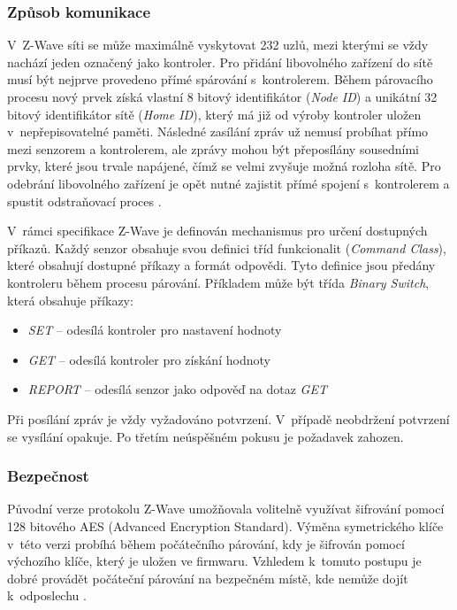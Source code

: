  \subsubsection{Způsob komunikace}
 V~Z-Wave síti se může maximálně vyskytovat 232 uzlů, mezi kterými se vždy nachází jeden označený
 jako kontroler. Pro přidání libovolného zařízení do sítě musí být nejprve provedeno přímé spárování
 s~kontrolerem. Během párovacího procesu nový prvek získá vlastní 8 bitový identifikátor (\textit{Node ID}) a 
 unikátní 32 bitový identifikátor sítě (\textit{Home ID}), který má již od výroby kontroler uložen v~nepřepisovatelné paměti.
 Následné zasílání zpráv už nemusí probíhat přímo mezi senzorem a kontrolerem, ale zprávy mohou
 být přeposílány sousedními prvky, které jsou trvale napájené, čímž se velmi zvyšuje možná rozloha sítě. 
 Pro odebrání libovolného zařízení je opět nutné zajistit přímé spojení s~kontrolerem a spustit odstraňovací
 proces \cite{cesnet-survey}.
 
 V~rámci specifikace Z-Wave \cite{zwave-spec} je definován mechanismus pro určení dostupných příkazů. Každý senzor obsahuje
 svou definici tříd funkcionalit (\textit{Command Class}), které obsahují dostupné příkazy a formát odpovědi. Tyto definice
 jsou předány kontroleru během procesu párování. Příkladem může být třída \textit{Binary Switch}, která obsahuje příkazy:
 \begin{itemize}
 \item \textit{SET} -- odesílá kontroler pro nastavení hodnoty 
 \item \textit{GET} -- odesílá kontroler pro získání hodnoty  
 \item \textit{REPORT} -- odesílá senzor jako odpověď na dotaz \textit{GET} 
 \end{itemize} 
 
 Při posílání zpráv je vždy vyžadováno potvrzení. V~případě neobdržení potvrzení se vysílání opakuje. 
 Po třetím neúspěšném pokusu je požadavek zahozen.
 
 \subsubsection{Bezpečnost}
 Původní verze protokolu Z-Wave umožňovala volitelně využívat šifrování pomocí 128 bitového AES (Advanced Encryption Standard).
 Výměna symetrického klíče v~této verzi probíhá během počátečního párování, kdy je šifrován pomocí
 výchozího
 klíče, který je uložen ve firmwaru. Vzhledem k~tomuto postupu je dobré provádět počáteční párování na bezpečném
 místě, kde nemůže dojít k~odposlechu \cite{zwave-S0-attack}.
 
